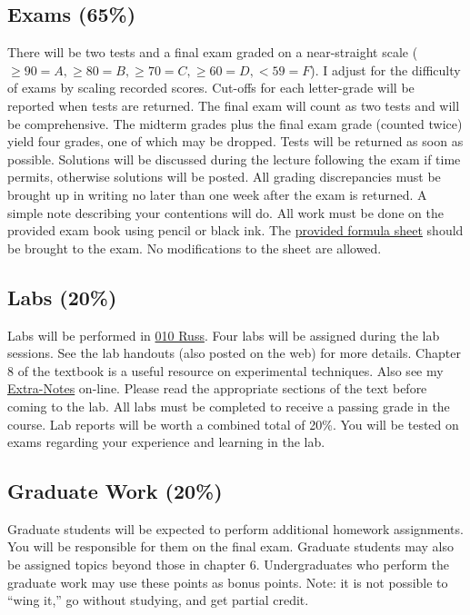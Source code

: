 \documentclass[10pt]{article}
\begin{document}
\subsection{Exams (65\%)}
There will be two  tests and a final exam graded on a near-straight scale ($\geq 90 = A,\geq 80 = B, \geq 70 = C, \geq 60 = D, < 59 = F$).  I  adjust for the difficulty of exams by scaling recorded scores. Cut-offs for each letter-grade will be reported when tests are returned.  The final exam will count as two tests and will be comprehensive.  The midterm grades plus the final exam grade (counted twice) yield four grades, one of which may be dropped.  Tests will be returned as soon as possible.  Solutions will be discussed during the lecture following the exam if time permits, otherwise solutions will be posted.  All grading discrepancies must be brought up in writing no later than one week after the exam is returned.  A simple note describing your contentions will do.  All work must be done on the provided exam book using pencil or black ink. The \href{http://www.cs.wright.edu/~jslater/materials/formulasheet.pdf}{provided formula sheet} should be brought to the exam. No modifications to the sheet are allowed. 

\subsection{Labs (20\%)\label{sec-labs}}
Labs will be performed in  \href{http://www.cs.wright.edu/~jslater/viblab/viblab.html}{010 Russ}. Four  labs will be assigned during the lab sessions.  See the lab handouts (also posted on the web) for more details.  Chapter 8 of the textbook is a useful resource on experimental techniques. Also see my \href{http://www.cs.wright.edu/~jslater/classes/vibration/Complex_Solution.pdf}{Extra-Notes} on-line. Please read the appropriate sections of the text before coming to the lab.  All labs must be completed to receive a passing grade in the course.  Lab reports will be worth a combined total of 20\%.  You will be tested on exams regarding your experience and learning in the lab.
\subsection{Graduate Work (20\%)} Graduate students will be expected to perform additional homework assignments.  You will be responsible for them on the final exam.  Graduate students may also be assigned  topics beyond those in chapter 6.  Undergraduates who perform the   graduate work may use these points as bonus points.  Note: it is not possible to ``wing it,'' go without studying, and get partial credit.
\end{document}
